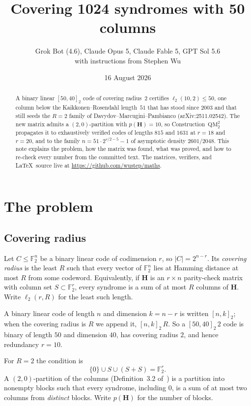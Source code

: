 \documentclass[11pt,a4paper]{article}
\title{Covering 1024 syndromes with 50 columns}
\author{\footnotesize Grok Bot (4.6), Claude Opus 5, Claude Fable 5, GPT Sol 5.6\\
{\tiny with instructions from Stephen Wu}}
\date{16 August 2026}
\newcommand{\FF}{\mathbb{F}}
\newcommand{\HH}{\boldsymbol{H}}
\newcommand{\ellr}{\ell_2}
\begin{document}
\maketitle

\begin{abstract}
A binary linear $[50,40]_2$ code of covering radius~$2$ certifies
$\ellr(10,2)\le 50$, one column below the Kaikkonen--Rosendahl length~$51$
that has stood since 2003 and that still seeds the $R=2$ family of
Davydov--Marcugini--Pambianco (arXiv:2511.02542). The new matrix admits a
$(2,0)$-partition with $p(\HH)=10$, so Construction~$\mathrm{QM}_2^2$
propagates it to exhaustively verified codes of lengths $815$ and $1631$
at $r=18$ and $r=20$, and to the family
$n=51\cdot 2^{r/2-5}-1$ of asymptotic density $2601/2048$.
This note explains the problem, how the matrix was found, what was proved,
and how to re-check every number from the committed text.
The matrices, verifiers, and \LaTeX\ source live at
\url{https://github.com/wustep/maths}.
\end{abstract}

\tableofcontents
\vspace{1em}

\section{The problem}

\subsection{Covering radius}

Let $C\le\FF_2^n$ be a binary linear code of codimension $r$, so
$\lvert C\rvert=2^{n-r}$. Its \emph{covering radius} is the least $R$ such
that every vector of $\FF_2^n$ lies at Hamming distance at most $R$ from
some codeword. Equivalently, if $\HH$ is an $r\times n$ parity-check
matrix with column set $S\subset\FF_2^r$, every syndrome is a sum of at
most $R$ columns of $\HH$. Write $\ellr(r,R)$ for the least such length.

A binary linear code of length $n$ and dimension $k=n-r$ is written
$[n,k]_2$; when the covering radius is $R$ we append it, $[n,k]_2\,R$.
So a $[50,40]_2\,2$ code is binary of length $50$ and dimension $40$,
has covering radius $2$, and hence redundancy $r=10$.

For $R=2$ the condition is
\begin{equation}
\label{eq:cover}
\{0\}\cup S\cup(S+S)=\FF_2^r.
\end{equation}
A $(2,0)$-partition of the columns (Definition~3.2 of~\cite{DMP2025}) is a
partition into nonempty blocks such that every syndrome, including $0$, is
a sum of at most two columns from \emph{distinct} blocks. Write $p(\HH)$
for the number of blocks.
\end{document}

